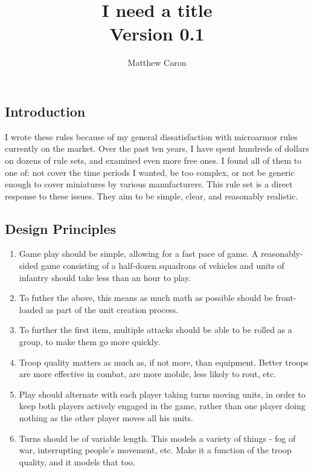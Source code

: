 \documentclass[12pt,titlepage]{article}
\title{I need a title\\\small{Version 0.1}}
\author{Matthew Caron}
\begin{document}
\maketitle
\begin{multicols}{2}

  \tableofcontents
  \newpage

  \section{Introduction}

  I wrote these rules because of my general dissatisfaction with
  microarmor rules currently on the market. Over the past ten years, I
  have spent hundreds of dollars on dozens of rule sets, and examined
  even more free ones. I found all of them to one of: not cover the
  time periods I wanted, be too complex, or not be generic enough to
  cover miniatures by various manufacturers. This rule set is a direct
  response to these issues. They aim to be simple, clear, and
  reasonably realistic.

  \subsection{Design Principles}

  \begin{enumerate}
  \item Game play should be simple, allowing for a fast pace of
    game. A reasonably-sided game consisting of a half-dozen
    squadrons of vehicles and units of infantry should take less
    than an hour to play.
  \item To futher the above, this means as much math as possible
    should be front-loaded as part of the unit creation process.
  \item To further the first item, multiple attacks should be able
    to be rolled as a group, to make them go more quickly.
  \item Troop quality matters as much as, if not more, than
    equipment. Better troops are more effective in combat, are more
    mobile, less likely to rout, etc.
  \item Play should alternate with each player taking turns moving
    units, in order to keep both players actively engaged in the
    game, rather than one player doing nothing as the other player
    moves all his units.
  \item Turns should be of variable length. This models a variety
    of things - fog of war, interrupting people's movement,
    etc. Make it a function of the troop quality, and it models that
    too.
  \end{enumerate}


\end{multicols}
\end{document}
